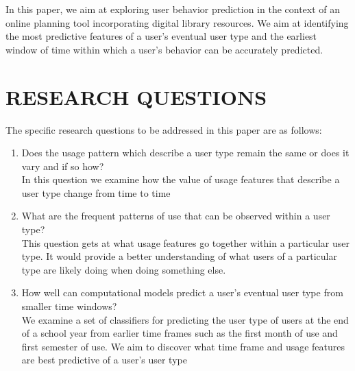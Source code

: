 \documentclass{acm_proc_article-sp}
\begin{document}
In this paper, we aim at exploring user behavior prediction in the context of an online planning tool incorporating digital library resources. We aim at identifying the most predictive features of a user's eventual user type and the earliest window of time within which a user's behavior can be accurately predicted.

\section{RESEARCH QUESTIONS}
The specific research questions to be addressed in this paper are as follows:
\begin{enumerate}
\item Does the usage pattern which describe a user type remain the same or does it vary and if so how?
\\In this question we examine how the value of usage features that describe a user type change from time to time
\item What are the frequent patterns of use that can be observed within a user type?
\\This question gets at what usage features go together within a particular user type. It would provide a better understanding of what users of a particular type are likely doing when doing something else.
\item How well can computational models predict a user's eventual user type from smaller time windows?
\\We examine a set of classifiers for predicting the user type of users at the end of a school year from earlier time frames such as
the first month of use and first semester of use. We aim to discover what time frame and usage features are best predictive of a user's user type
\end{enumerate}
\end{document}
